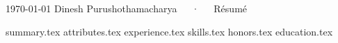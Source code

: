 \documentclass[20pt, a4paper]{awesome-cv}
\newcommand*{\sectiondir}{resume/}
\begin{document}
\makecvheader

\makecvfooter
  {\today}
  {Dinesh Purushothamacharya~~~·~~~Résumé}
  {\thepage}

{summary.tex}
{attributes.tex}
{experience.tex}
{skills.tex}
{honors.tex}
{education.tex}
\end{document}
